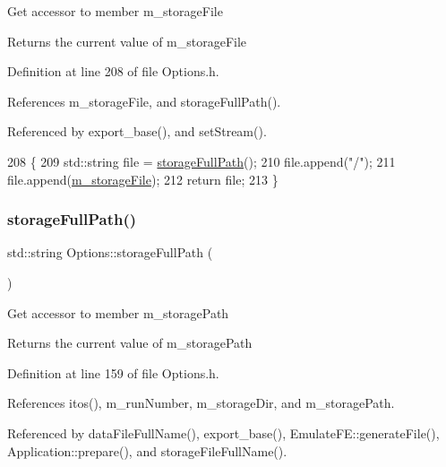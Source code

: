 Get accessor to member m\+\_\+storage\+File \begin{DoxyReturn}{Returns}
the current value of m\+\_\+storage\+File 
\end{DoxyReturn}


Definition at line 208 of file Options.\+h.



References m\+\_\+storage\+File, and storage\+Full\+Path().



Referenced by export\+\_\+base(), and set\+Stream().


\begin{DoxyCode}
208                                         \{
209                 std::string file = \hyperlink{classOptions_aa5fe6b85088f3012226869480790a383}{storageFullPath}();
210                 file.append(\textcolor{stringliteral}{"/"});
211                 file.append(\hyperlink{classOptions_a4d952db4e93d3aae6db86d89faa3677a}{m\_storageFile});
212                 \textcolor{keywordflow}{return} file;
213         \}
\end{DoxyCode}
\mbox{\label{classOptions_aa5fe6b85088f3012226869480790a383}} 
\subsubsection{\texorpdfstring{storage\+Full\+Path()}{storageFullPath()}}
{\footnotesize\ttfamily std\+::string Options\+::storage\+Full\+Path (\begin{DoxyParamCaption}{ }\end{DoxyParamCaption})\hspace{0.3cm}{\ttfamily [inline]}}

Get accessor to member m\+\_\+storage\+Path \begin{DoxyReturn}{Returns}
the current value of m\+\_\+storage\+Path 
\end{DoxyReturn}


Definition at line 159 of file Options.\+h.



References itos(), m\+\_\+run\+Number, m\+\_\+storage\+Dir, and m\+\_\+storage\+Path.



Referenced by data\+File\+Full\+Name(), export\+\_\+base(), Emulate\+F\+E\+::generate\+File(), Application\+::prepare(), and storage\+File\+Full\+Name().



